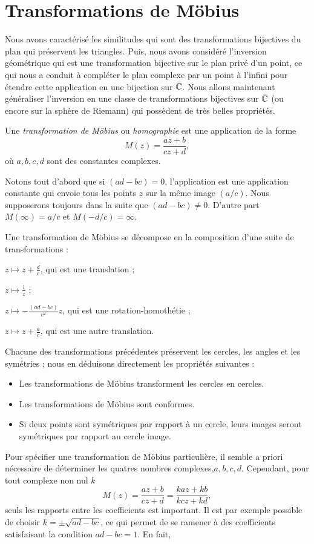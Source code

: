  
\section{Transformations de Möbius} 
Nous avons caractérisé les similitudes qui sont des transformations bijectives du plan qui préservent les triangles. Puis, nous avons considéré l'inversion géométrique qui est une transformation bijective sur le plan privé d'un point, ce qui nous a conduit à compléter le plan complexe par un point à l'infini pour étendre cette application en une bijection sur $\bar{\mathbb{C}}$. Nous allons maintenant généraliser l'inversion en une classe de transformations bijectives sur $\bar{\mathbb{C}}$ (ou encore sur la sphère de Riemann) qui possèdent de très belles propriétés.

Une \textit{transformation de Möbius} ou \textit{homographie} est une application de la forme 
\[M(z)=\frac{a z +b}{c z +d},\]
où $a,b,c,d$ sont des constantes complexes. 

Notons tout d'abord que si $(ad-bc)=0$, l'application est une application constante qui envoie tous les points $z$ sur la même image $(a/c)$. Nous supposerons toujours dans la suite que $(ad-bc) \neq 0$. D'autre part $M(\infty)=a/c$ et $M(-d/c)=\infty$.

\begin{prop}
Une transformation de Möbius se décompose en la composition d'une suite de transformations :
\begin{MYenumerate}
\item $z \mapsto z +\frac{d}{c}$, qui est une translation ;
\item $z \mapsto \frac{1}{z}$ ;
\item $z \mapsto -\frac{(ad-bc)}{c^2}z$, qui est une rotation-homothétie ;
\item $z \mapsto z +\frac{a}{c}$, qui est une autre translation.
\end{MYenumerate}
\end{prop}

Chacune des transformations précédentes préservent les cercles, les angles et les symétries ; nous en déduisons directement les propriétés suivantes :
\begin{itemize}
\item Les transformations de Möbius transforment les cercles en cercles.
\item Les transformations de Möbius sont conformes.
\item Si deux points sont symétriques par rapport à un cercle, leurs images seront symétriques par rapport au cercle image.
\end{itemize}
Pour spécifier une transformation de Möbius particulière, il semble a priori nécessaire de déterminer les quatres nombres complexes,$a,b,c,d$. Cependant, pour tout complexe non nul $k$ 
\[M(z)= \frac{a z +b}{c z +d}=\frac{k a z +k b}{k c z +k d},\]
seuls les rapports entre les coefficients est important. Il est par exemple possible de choisir $k=\pm \sqrt{ad-bc}$, ce qui permet de se ramener à des coefficients satisfaisant la condition $ad-bc=1$. En fait, 


